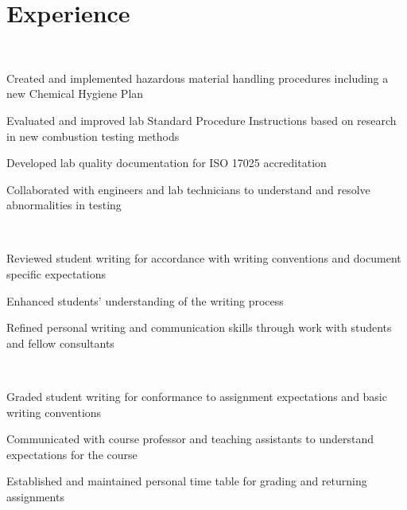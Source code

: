 \documentclass[]{deedy-resume-openfont}
\begin{document}
\begin{minipage}[t]{0.66\textwidth} 


\section{Experience}
\sectionsep
{} \\
\vspace{\topsep} %
\begin{tightemize}
	\item Created and implemented hazardous material handling procedures including a new Chemical Hygiene Plan
	\item Evaluated and improved lab Standard Procedure Instructions based on research in new combustion testing methods 
	\item Developed lab quality documentation for ISO 17025 accreditation
	\item Collaborated with engineers and lab technicians to understand and resolve abnormalities in testing
\end{tightemize}
\sectionsep

 \\
\begin{tightemize}
	\item Reviewed student writing for accordance with writing conventions and document specific expectations
	\item Enhanced students' understanding of the writing process
	\item Refined personal writing and communication skills through work with students and fellow consultants
\end{tightemize}
\sectionsep

 \\
\begin{tightemize}
	\item Graded student writing for conformance to assignment expectations and basic writing conventions
	\item Communicated with course professor and teaching assistants to understand expectations for the course
	\item Established and maintained personal time table for grading and returning assignments
\end{tightemize}
\sectionsep


\end{minipage}
\end{document}
